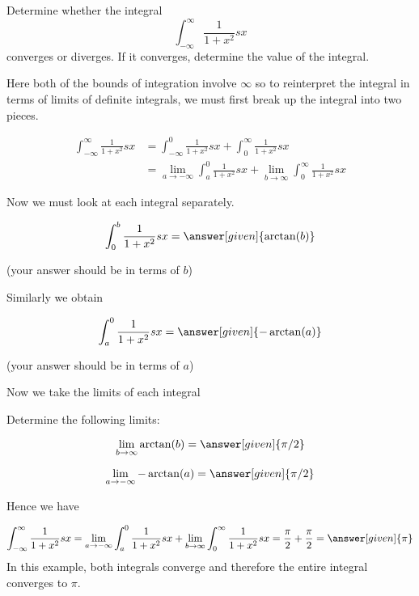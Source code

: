 \documentclass{ximera}
\begin{document}
\begin{example}
Determine whether the integral
\[
\int_{-\infty}^{\infty} \frac{1}{1+x^2} sx 
\]
converges or diverges. If it converges, determine the value of the integral. 
\begin{explanation}
Here both of the bounds of integration involve $\infty$ so to reinterpret the integral in terms of limits of definite integrals, 
we must first break up the integral into two pieces.

\begin{align*}
\int_{-\infty}^{\infty} \frac{1}{1+x^2} sx&= \int_{-\infty}^{0} \frac{1}{1+x^2} sx + \int_{0}^{\infty} \frac{1}{1+x^2} sx \\
& =\lim_{a \to -\infty} \int_{a}^{0} \frac{1}{1+x^2} sx + \lim_{b \to \infty} \int_{0}^{\infty} \frac{1}{1+x^2} sx 
\end{align*}
 
Now we must look at each integral separately. 

\[
\int_{0}^{b} \frac{1}{1+x^2} sx =  \answer[given]{\arctan(b)}
\]
\begin{onlineOnly}
(your answer should be in terms of $b$)
\end{onlineOnly}
Similarly we obtain

\[
\int_{a}^{0} \frac{1}{1+x^2} sx= \answer[given]{-\arctan(a)}
\]
\begin{onlineOnly}
 (your answer should be in terms of $a$)
 \end{onlineOnly}

Now we take the limits of each integral

\begin{question}
Determine the following limits:

 \begin{prompt}
   \[
    \lim_{b\to\infty} \arctan(b) = \answer[given]{\pi/2}
    \]

\[
\lim_{a \to -\infty} -\arctan(a)=\answer[given]{\pi/2}
\]
  \end{prompt}
\end{question}

Hence we have

\[
\int_{-\infty}^{\infty} \frac{1}{1+x^2} sx=\lim_{a \to -\infty} \int_{a}^{0} \frac{1}{1+x^2} sx + \lim_{b \to \infty} \int_{0}^{\infty} \frac{1}{1+x^2} sx =\frac{\pi}{2}+\frac{\pi}{2} = \answer[given]{\pi}\]
In this example, both integrals converge and therefore the entire integral converges to $\pi$. 
\end{explanation}
\end{example}
\end{document}
